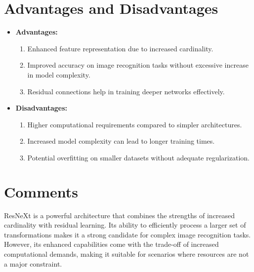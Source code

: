 \section{Advantages and Disadvantages}
\begin{itemize}
    \item \textbf{Advantages:}
    \begin{enumerate}
        \item Enhanced feature representation due to increased cardinality.
        \item Improved accuracy on image recognition tasks without excessive increase in model complexity.
        \item Residual connections help in training deeper networks effectively.
    \end{enumerate}
    \item \textbf{Disadvantages:}
    \begin{enumerate}
        \item Higher computational requirements compared to simpler architectures.
        \item Increased model complexity can lead to longer training times.
        \item Potential overfitting on smaller datasets without adequate regularization.
    \end{enumerate}
\end{itemize}

\section{Comments}
ResNeXt is a powerful architecture that combines the strengths of increased cardinality with residual learning. Its ability to efficiently process a larger set of transformations makes it a strong candidate for complex image recognition tasks. However, its enhanced capabilities come with the trade-off of increased computational demands, making it suitable for scenarios where resources are not a major constraint.
